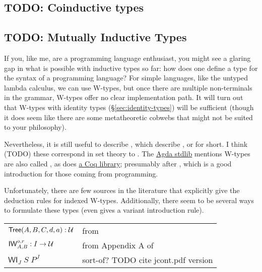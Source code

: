\documentclass[11pt]{article} %
\theoremstyle{definition}
\theoremstyle{remark}
\begin{document}
\subsection{TODO: Coinductive types}

\subsection{TODO: Mutually Inductive Types}

If you, like me, are a programming language enthusiast, you might see a glaring gap in what is possible with inductive types so far: how does one define a type for the syntax of a programming language?
For simple languages, like the untyped lambda calculus, we can use W-types, but once there are multiple non-terminals in the grammar, W-types offer no clear implementation path.
It will turn out that W-types with identity types (\S\ref{sec:identity-types}) will be sufficient (though it does seem like there are some metatheoretic cobwebs that might not be suited to your philosophy).

Nevertheless, it is still useful to describe , which describe , or  for short.
I think (TODO) these correspond in set theory to .
The \href{https://github.com/agda/agda-stdlib/blob/master/src/Data/W/Indexed.agda}{Agda stdlib} mentions W-types are also called , as does \href{http://www-sop.inria.fr/lemme/Venanzio.Capretta/coq/General_Trees.g.html}{a Coq library}; presumably after \cite{petersson-synek_1989}, which is a good introduction for those coming from programming.

Unfortunately, there are few sources in the literature that explicitly give the deduction rules for indexed W-types.
Additionally, there seem to be several ways to formulate these types (even \cite{petersson-synek_1989} gives a variant introduction rule).
\begin{center}
\renewcommand{\arraystretch}{1.2}
\begin{tabular}{lp{10cm}}
$\mathsf{Tree}(A,B,C,d,a) : \mathcal{U}$ & from \cite{petersson-synek_1989} \\
$\mathop\mathsf{IW}_{A,B}^{o,r} : I \to \mathcal{U}$ & from Appendix A of \cite{kaposi_2020} \\
$\mathsf{WI}_J\;S\;P^J$ & sort-of? TODO cite jcont.pdf version \\
\end{tabular}
\end{center}
\end{document}
